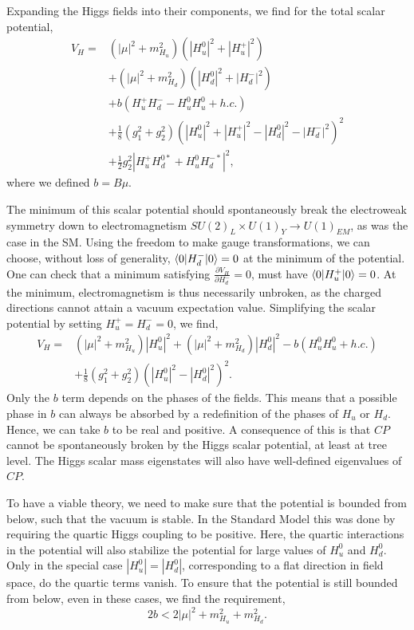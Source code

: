 Expanding the Higgs fields into their components, we find for the total scalar potential,
\begin{align}
  V_H = & \left( |\mu|^2 + m_{H_u}^2 \right)\left( |H_u^0|^2 + |H_u^+|^2 \right) \\
	& + \left( |\mu|^2 + m_{H_d}^2 \right)\left( |H_d^0|^2 + |H_d^-|^2 \right) \\
     & + b\left( H_u^+ H_d^- - H_u^0 H_u^0 + h.c.\right)  \\
     & + \frac{1}{8} \left( g_1^2 + g_2^2 \right) \left( |H_u^0|^2 + |H_u^+|^2 - |H_d^0|^2 -
|H_d^-|^2 \right)^2 \\
    & + \frac{1}{2} g_2^2 |H_u^+ H_d^{0*} + H_u^0 H_d^{-*}|^2 ,
\end{align}
where we defined $b = B \mu$.


The minimum of this scalar potential should spontaneously break the electroweak symmetry down to
electromagnetism $SU(2)_L \times U(1)_Y \rightarrow U(1)_{EM}$, as was the case in the SM. 
Using the freedom to make gauge transformations, we can choose, without loss of generality,
$\braket{0|H_d^-|0} = 0$ at the minimum of the potential. 
One can check that a minimum satisfying $\frac{\partial V_H}{\partial H_d^-} = 0$, must have
$\braket{0|H_u^+|0} = 0$. At the minimum, electromagnetism is thus necessarily unbroken, as the
charged directions cannot attain a vacuum expectation value.
Simplifying the scalar potential by setting $H_u^+ = H_d^- = 0$, we find,
\begin{equation}
  \begin{aligned}
  V_H = & \left( |\mu|^2 + m_{H_u}^2 \right) |H_u^0|^2  + \left( |\mu|^2 + m_{H_d}^2 \right)
|H_d^0|^2 - b\left( H_u^0 H_u^0 + h.c.\right)  \\
     & + \frac{1}{8} \left( g_1^2 + g_2^2 \right) \left( |H_u^0|^2  - |H_d^0|^2 \right)^2 .
\end{aligned}
\end{equation}
Only the $b$ term depends on the phases of the fields. This means that a possible phase in $b$ can
always be absorbed by a redefinition of the phases of $H_u$ or $H_d$. Hence, we can take $b$ to be
real and positive. A consequence of this is that $CP$ cannot be spontaneously broken by the Higgs
scalar potential, at least at tree level. The Higgs scalar mass eigenstates will also have
well-defined eigenvalues of $CP$. 

To have a viable theory, we need to make sure that the potential is bounded from below, such that
the vacuum is stable. 
In the Standard Model this was done by requiring the quartic Higgs coupling to be positive. 
Here, the quartic interactions in the potential will also stabilize the potential for large values
of $H_u^0$ and $H_d^0$. Only in the special case $|H_u^0| = |H_d^0|$, corresponding to a flat
direction in field space, do the quartic terms vanish. To ensure that the potential is still bounded
from below, even in these cases, we find the requirement,
\begin{equation}
  2b < 2 |\mu|^2 + m_{H_u}^2 + m_{H_d}^2 .
\end{equation}

